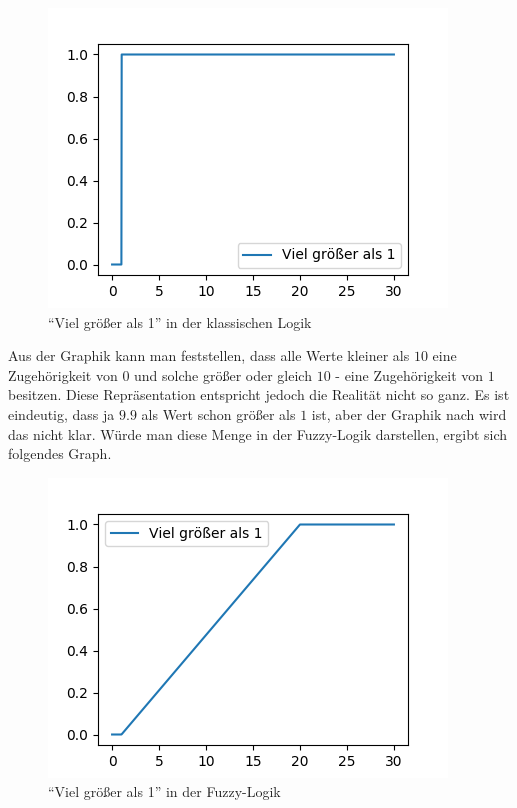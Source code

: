
\begin{figure}[htbp]
	\centering
	\includegraphics[scale=0.5]{images/classic_logic.png}
	\caption{``Viel größer als 1'' in der klassischen Logik}\label{class_dar}
\end{figure}

Aus der Graphik kann man feststellen, dass alle Werte kleiner als $10$ eine Zugehörigkeit von $0$ und solche größer oder gleich $10$ - eine Zugehörigkeit von $1$ besitzen. Diese Repräsentation entspricht jedoch die Realität nicht so ganz. Es ist eindeutig, dass ja $9.9$ als Wert schon größer als $1$ ist, aber der Graphik nach wird das nicht klar. Würde man diese Menge in der Fuzzy-Logik darstellen, ergibt sich folgendes Graph.

\begin{figure}[htbp]
	\centering
	\includegraphics[scale=0.5]{images/fuzz_logic.png}
	\caption{``Viel größer als 1'' in der Fuzzy-Logik}\label{fuzzy_dar}
\end{figure}

